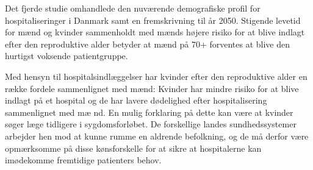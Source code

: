 Det fjerde studie omhandlede den nuv{\ae}rende demografiske profil for hospitaliseringer 
i Danmark samt en fremskrivning til {\aa}r 2050. Stigende levetid for m{\ae}nd og kvinder 
sammenholdt med m{\ae}nds h{\o}jere risiko for at blive indlagt efter den reproduktive 
alder betyder at m{\ae}nd p{\aa} 70+ forventes at blive den hurtigst voksende patientgruppe.

Med hensyn til hospitalsindl{\ae}ggelser har kvinder efter den reproduktive alder 
en r{\ae}kke fordele sammenlignet med m{\ae}nd: Kvinder har mindre risiko for at blive 
indlagt p{\aa} et hospital og de har lavere d{\o}delighed efter hospitalisering sammenlignet 
med m{\ae} nd. En mulig forklaring p{\aa} dette kan v{\ae}re at kvinder s{\o}ger l{\ae}ge 
tidligere i sygdomsforl{\o}bet. De forskellige landes sundhedssystemer arbejder hen mod 
at kunne rumme en aldrende befolkning, og de m{\aa} derfor v{\ae}re opm{\ae}rksomme p{\aa} 
disse k{\o}nsforskelle for at sikre at hospitalerne kan im{\o}dekomme fremtidige 
patienters behov.


